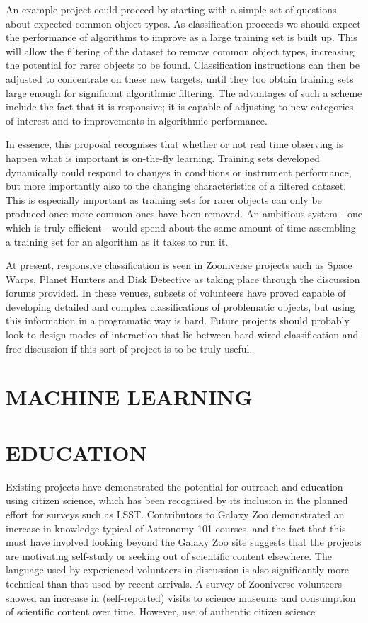 \documentclass{pasa}
\begin{document}
An example project could proceed by starting with a simple set of questions about expected common object types. As classification proceeds we should expect the performance of algorithms to improve as a large training set is built up. This will allow the filtering of the dataset to remove common object types, increasing the potential for rarer objects to be found. Classification instructions can then be adjusted to concentrate on these new targets, until they too obtain training sets large enough for significant algorithmic filtering. The advantages of such a scheme include the fact that it is responsive; it is capable of adjusting to new categories of interest and to improvements in algorithmic performance. 

In essence, this proposal recognises that whether or not real time observing is happen what is important is on-the-fly learning. Training sets developed dynamically could respond to changes in conditions or instrument performance, but more importantly also to the changing characteristics of a filtered dataset. This is especially important as training sets for rarer objects can only be produced once more common ones have been removed. An ambitious system - one which is truly efficient - would spend about the same amount of time assembling a training set for an algorithm as it takes to run it. 

At present, responsive classification is seen in Zooniverse projects such as Space Warps, Planet Hunters and Disk Detective as taking place through the discussion forums provided. In these venues, subsets of volunteers have proved capable of developing detailed and complex classifications of problematic objects, but using this information in a programatic way is hard. Future projects should probably look to design modes of interaction that lie between hard-wired classification and free discussion if this sort of project is to be truly useful. 


\section{MACHINE LEARNING}
\label{sec:ml}

\section{EDUCATION}
\label{sec:edu}

Existing projects have demonstrated the potential for outreach and education using citizen science, which has been recognised by its inclusion in the planned effort for surveys such as LSST. Contributors to Galaxy Zoo demonstrated an increase in knowledge typical of Astronomy 101 courses, and the fact that this must have involved looking beyond the Galaxy Zoo site suggests that the projects are motivating self-study or seeking out of scientific content elsewhere. The language used by experienced volunteers in discussion is also significantly more technical than that used by recent arrivals. A survey of Zooniverse volunteers showed an increase in (self-reported) visits to science museums and consumption of scientific content over time. However, use of authentic citizen science 
\end{document}
